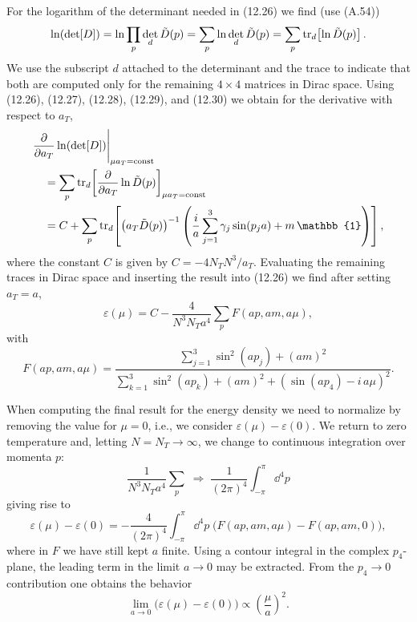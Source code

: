 For the logarithm of the determinant needed in (12.26) we find (use (A.54))
\begin{equation}
  \ln(\det[D]) = \ln\prod_p \det_d\tilde{D}(p)
    = \sum_p \ln\det_d\tilde{D}(p)
    = \sum_p \operatorname{tr}_d\!\left[\ln\tilde{D}(p)\right].
\end{equation}
We use the subscript $d$ attached to the determinant and the trace to indicate
that both are computed only for the remaining $4\times 4$ matrices in Dirac
space. Using (12.26), (12.27), (12.28), (12.29), and (12.30) we obtain for the
derivative with respect to $a_T$,
\begin{equation}
\begin{split}
  &\frac{\partial}{\partial a_T}\ln(\det[D])\Bigg|_{\mu a_T=\mathrm{const}}\\
  &\quad= \sum_p \tr_d\!\left[
    \frac{\partial}{\partial a_T}\ln\tilde{D}(p)
  \right]_{\mu a_T=\mathrm{const}} \\
  &\quad= C + \sum_p \tr_d\!\left[
    \left(a_T\tilde{D}(p)\right)^{-1}\left(
      \frac{i}{a}\sum_{j=1}^3\gamma_j\sin(p_j a) + m\,\mathbb{1}
    \right)
  \right],
\end{split}
\end{equation}
where the constant $C$ is given by $C = -4N_T N^3/a_T$. Evaluating the
remaining traces in Dirac space and inserting the result into (12.26) we find
after setting $a_T = a$,
\begin{equation}
  \varepsilon(\mu) = C - \frac{4}{N^3 N_T a^4}\sum_p F(ap, am, a\mu),
\end{equation}
with
\begin{equation}
  F(ap, am, a\mu)
  = \frac{\sum_{j=1}^3\sin^2(a p_j) + (am)^2}
         {\sum_{k=1}^3\sin^2(a p_k) + (am)^2
          + \left(\sin(a p_4) - i\,a\mu\right)^2}.
\end{equation}

When computing the final result for the energy density we need to normalize by
removing the value for $\mu = 0$, i.e., we consider
$\varepsilon(\mu) - \varepsilon(0)$. We return to zero temperature and, letting
$N = N_T \to \infty$, we change to continuous integration over momenta $p$:
\begin{equation}
  \frac{1}{N^3 N_T a^4}\sum_p
  \;\Rightarrow\;
  \frac{1}{(2\pi)^4}\int_{-\pi}^{\pi}\dd^4 p
\end{equation}
giving rise to
\begin{equation}
  \varepsilon(\mu) - \varepsilon(0) = -\frac{4}{(2\pi)^4}\int_{-\pi}^{\pi}
    \dd^4 p\;\big(F(ap,am,a\mu) - F(ap,am,0)\big),
\end{equation}
where in $F$ we have still kept $a$ finite. Using a contour integral in the
complex $p_4$-plane, the leading term in the limit $a\to 0$ may be extracted.
From the $p_4 \to 0$ contribution one obtains the behavior
\begin{equation}
  \lim_{a\to 0}\big(\varepsilon(\mu) - \varepsilon(0)\big) \propto
    \left(\frac{\mu}{a}\right)^2 .
\end{equation}

